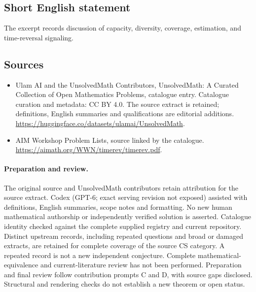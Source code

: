 \documentclass[11pt]{article}
\begin{document}
\subsection{Short English statement}
The excerpt records discussion of capacity, diversity, coverage, estimation, and time-reversal signaling.
\subsection{Sources}
\begin{itemize}
\item[\hypertarget{source:statement:1}{S1}] Ulam AI and the UnsolvedMath Contributors, UnsolvedMath: A Curated Collection of Open Mathematics Problems, catalogue entry. Catalogue curation and metadata: CC BY 4.0. The source extract is retained; definitions, English summaries and qualifications are editorial additions.
\url{https://huggingface.co/datasets/ulamai/UnsolvedMath}.
\item[\hypertarget{source:statement:2}{S2}] AIM Workshop Problem Lists, source linked by the catalogue.
\url{https://aimath.org/WWN/timerev/timerev.pdf}.
\end{itemize}
\paragraph{Preparation and review.}
The original source and UnsolvedMath contributors retain attribution for the source extract. Codex (GPT-6; exact serving revision not exposed) assisted with definitions, English summaries, scope notes and formatting. No new human mathematical authorship or independently verified solution is asserted. Catalogue identity checked against the complete supplied registry and current repository. Distinct upstream records, including repeated questions and broad or damaged extracts, are retained for complete coverage of the source CS category. A repeated record is not a new independent conjecture. Complete mathematical-equivalence and current-literature review has not been performed. Preparation and final review follow contribution prompts C and D, with source gaps disclosed. Structural and rendering checks do not establish a new theorem or open status.
\label{end:statement}
\end{document}
